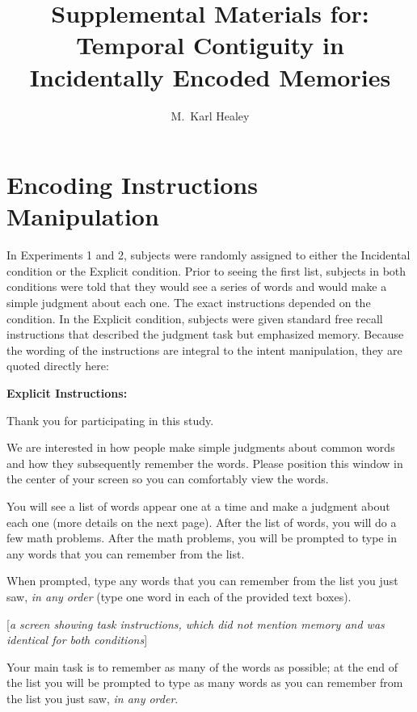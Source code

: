 \documentclass[man,natbib,floatsintext]{apa6} %
\title{Supplemental Materials for: Temporal Contiguity in Incidentally Encoded Memories}
\author{M.\ Karl Healey}
\affiliation{Michigan State University}
\begin{document}
\maketitle

\newcommand\listlength{16} %
\newcommand\presrate{4 seconds} %
\newcommand\isi{1 second} %
\newcommand\DFRDelay{16 seconds} %
\newcommand\recalltime{75 seconds} %
\newcommand\totalss{XX}
\newcommand\totalexcluded{XX}

\section{Encoding Instructions Manipulation} In Experiments 1 and 2, subjects were randomly assigned to either the Incidental condition or the Explicit condition. Prior to seeing the first list, subjects in both conditions were told that they would see a series of words and would make a simple judgment about each one. The exact instructions depended on the condition. In the Explicit condition, subjects were given standard free recall instructions that described the judgment task but emphasized memory. Because the wording of the instructions are integral to the intent manipulation, they are quoted directly here:

\textbf{Explicit Instructions:}

\begin{displayquote}
        Thank you for participating in this study. 

        We are interested in how people make simple judgments about common words and
        how they subsequently remember the words. Please position this window in the center
        of your screen so you can comfortably view the words.

        You will see a list of words appear one at a time and make a judgment about each one
        (more details on the next page). After the list of words, you will do a few math problems.
        After the math problems, you will be prompted to type in any words that you can remember
        from the list.

        When prompted, type any words that you can remember from the list you just saw,
        \emph{in any order} (type one word in each of the provided text boxes).

    [\textit{a screen showing task instructions, which did not mention memory and was identical for both conditions}]

        Your main task is to remember as many of the words as possible; at the end of the list you will be prompted to
    type as many words as you can remember from the list you just saw, \emph{in any order}.
\end{displayquote}
\end{document}
